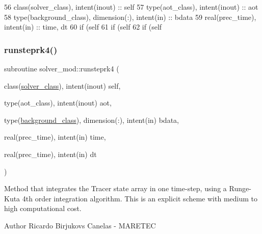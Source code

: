 \begin{DoxyCode}
56     \textcolor{keywordtype}{class}(solver\_class), \textcolor{keywordtype}{intent(inout)} :: self
57     \textcolor{keywordtype}{type}(aot\_class), \textcolor{keywordtype}{intent(inout)} :: aot
58     \textcolor{keywordtype}{type}(background\_class), \textcolor{keywordtype}{dimension(:)}, \textcolor{keywordtype}{intent(in)} :: bdata
59     \textcolor{keywordtype}{real(prec\_time)}, \textcolor{keywordtype}{intent(in)} :: time, dt
60     \textcolor{keywordflow}{if} (self%
61     \textcolor{keywordflow}{if} (self%
62     \textcolor{keywordflow}{if} (self%
\end{DoxyCode}
\mbox{\label{namespacesolver__mod_ae59da54f053ae369d76f130b3790f3b7}} 
\subsubsection{\texorpdfstring{runsteprk4()}{runsteprk4()}}
{\footnotesize\ttfamily subroutine solver\+\_\+mod\+::runsteprk4 (\begin{DoxyParamCaption}\item[{class(\mbox{\hyperlink{structsolver__mod_1_1solver__class}{solver\+\_\+class}}), intent(inout)}]{self,  }\item[{type(aot\+\_\+class), intent(inout)}]{aot,  }\item[{type(\mbox{\hyperlink{structbackground__mod_1_1background__class}{background\+\_\+class}}), dimension(\+:), intent(in)}]{bdata,  }\item[{real(prec\+\_\+time), intent(in)}]{time,  }\item[{real(prec\+\_\+time), intent(in)}]{dt }\end{DoxyParamCaption})\hspace{0.3cm}{\ttfamily [private]}}



Method that integrates the Tracer state array in one time-\/step, using a Runge-\/\+Kuta 4th order integration algorithm. This is an explicit scheme with medium to high computational cost. 

\begin{DoxyAuthor}{Author}
Ricardo Birjukovs Canelas -\/ M\+A\+R\+E\+T\+EC 
\end{DoxyAuthor}

